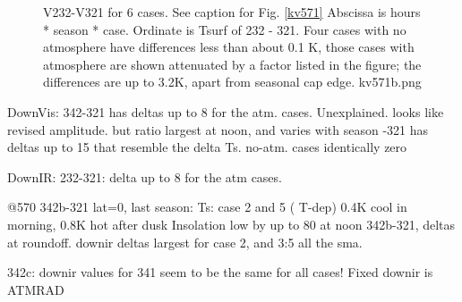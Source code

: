 \documentclass{article}
\begin{document}
\begin{figure}[!ht] 
\caption[V232-V321]{V232-V321 for 6 cases. See caption for Fig.  \ref{kv571}
  Abscissa is hours * season * case. Ordinate is Tsurf of 232 - 321.  Four
  cases with no atmosphere have differences less than about 0.1 K, those cases
  with atmosphere are shown attenuated by a factor listed in the figure; the
  differences are up to 3.2K, apart from seasonal cap edge.
\label{kv571b}  kv571b.png }
\end{figure} 

DownVis: 342-321 has deltas up to 8 for the atm. cases.  Unexplained.
\qii looks like revised amplitude.  but ratio largest at noon, and varies with season
-321 has deltas up to 15 that resemble the delta Ts.
\qi no-atm. cases identically zero


DownIR: 232-321: delta up to 8 for the atm cases.

 @570 342b-321 lat=0, last season:
\qi Ts:  case 2 and 5 ( T-dep) 0.4K cool in morning, 0.8K hot after dusk
 \qi Insolation low by up to 80 at noon
\qiii 342b-321, deltas at roundoff.
 downir  deltas largest for case 2, and 3:5 all the sma.

 342c: downir values for 341 seem to be the same for all cases! Fixed
\qii downir is ATMRAD
\end{document}
